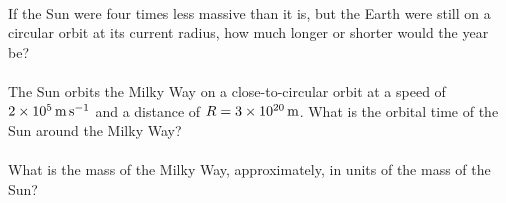 \documentclass[12pt]{article}
\begin{document}
\paragraph{\theproblem}%
If the Sun were four times less massive than it is, but the Earth were
still on a circular orbit at its current radius, how much longer or
shorter would the year be?

\paragraph{\theproblem}%
The Sun orbits the Milky Way on a close-to-circular orbit at a speed
of $2\times 10^5\,\mathrm{m}\,\mathrm{s}^{-1}$ and a distance of $R= 3\times 10^{20}\,\mathrm{m}$.
What is the orbital time of the Sun around the Milky Way?

\paragraph{\theproblem}%
What is the mass of the Milky Way, approximately, in units of the mass
of the Sun?
\end{document}
